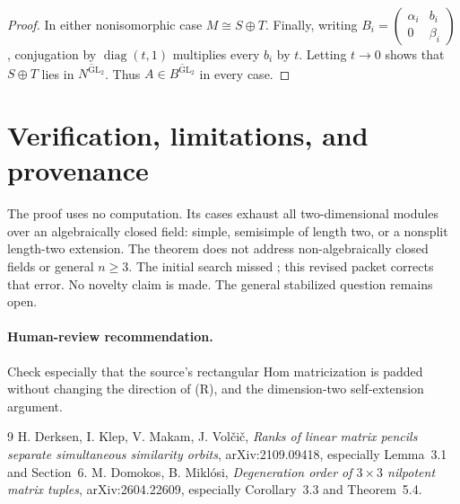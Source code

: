 \documentclass[11pt]{article}
\newcommand{\GL}{\operatorname{GL}}
\begin{document}
\begin{proof}
In either nonisomorphic case $M\cong S\oplus T$.  Finally, writing
$B_i=\left(\begin{smallmatrix}\alpha_i&b_i\\0&\beta_i\end{smallmatrix}\right)$,
conjugation by $\operatorname{diag}(t,1)$ multiplies every $b_i$ by $t$.
Letting $t\to0$ shows that $S\oplus T$ lies in
$\overline{N^{\GL_2}}$.  Thus $A\in\overline{B^{\GL_2}}$ in every case.
\end{proof}

\section{Verification, limitations, and provenance}
The proof uses no computation.  Its cases exhaust all two-dimensional modules
over an algebraically closed field: simple, semisimple of length two, or a
nonsplit length-two extension. The theorem does not address non-algebraically
closed fields or general $n\geq3$. The initial search missed \cite{DM}; this
revised packet corrects that error. No novelty claim is made. The general
stabilized question remains open.

\paragraph{Human-review recommendation.} Check especially that the source's
rectangular Hom matricization is padded without changing the direction of
(R), and the dimension-two self-extension argument.

\begin{thebibliography}{9}
 H. Derksen, I. Klep, V. Makam, J. Vol\v{c}i\v{c},
\emph{Ranks of linear matrix pencils separate simultaneous similarity
orbits}, arXiv:2109.09418, especially Lemma~3.1 and Section~6.
 M. Domokos, B. Mikl\'osi,
\emph{Degeneration order of $3\times3$ nilpotent matrix tuples},
arXiv:2604.22609, especially Corollary~3.3 and Theorem~5.4.
\end{thebibliography}
\end{document}
